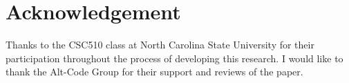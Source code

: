 \documentclass{acm_proc_article-sp}
\begin{document}
\section{Acknowledgement}
Thanks to the CSC510 class at North Carolina State University for
their participation throughout the process of developing this research.
I would like to thank the Alt-Code Group for their support and reviews of the
paper.

%

%
%
\balancecolumns
\end{document}

